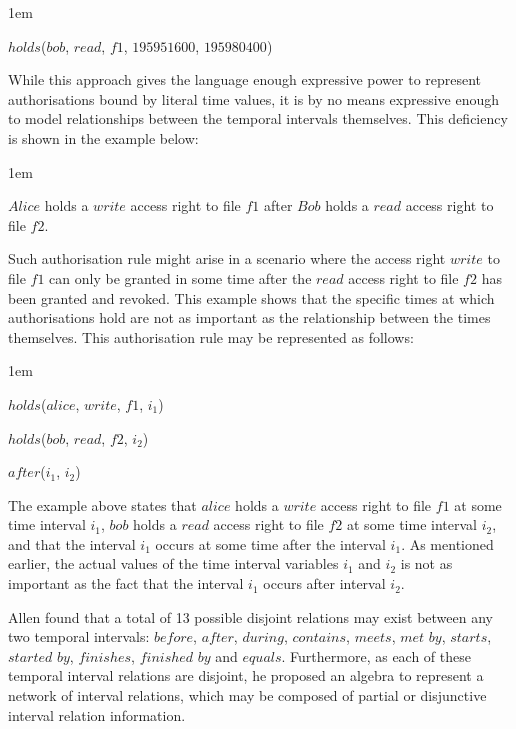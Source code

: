 \documentclass[global,twocolumn,final]{svjour}
\newenvironment{vquote}
  {\begin{list}{}{\leftmargin 1em}\item[]}
  {\end{list}}
\begin{document}
    \begin{vquote}
      $holds$($bob$, $read$, $f1$, $195951600$, $195980400$)
    \end{vquote}

    While this approach gives the language enough expressive power to represent
    authorisations bound by literal time values, it is by no means expressive
    enough to model relationships between the temporal intervals themselves.
    This deficiency is shown in the example below:

    \begin{vquote}
      $Alice$ holds a $write$ access right to file $f1$ after $Bob$ holds a
      $read$ access right to file $f2$.
    \end{vquote}

    Such authorisation rule might arise in a scenario where the access right
    $write$ to file $f1$ can only be granted in some time after the $read$
    access right to file $f2$ has been granted and revoked. This example shows
    that the specific times at which authorisations hold are not as important
    as the relationship between the times themselves. This authorisation rule
    may be represented as follows:

    \begin{vquote}
      $holds$($alice$, $write$, $f1$, $i_{1}$)

      $holds$($bob$, $read$, $f2$, $i_{2}$)

      $after$($i_{1}$, $i_{2}$)
    \end{vquote}

    The example above states that $alice$ holds a $write$ access right to file
    $f1$ at some time interval $i_{1}$, $bob$ holds a $read$ access right to
    file $f2$ at some time interval $i_{2}$, and that the interval $i_{1}$
    occurs at some time after the interval $i_{1}$. As mentioned earlier, the
    actual values of the time interval variables $i_{1}$ and $i_{2}$ is not as
    important as the fact that the interval $i_{1}$ occurs after interval
    $i_{2}$.

    Allen \cite{AL} found that a total of 13 possible disjoint relations may
    exist between any two temporal intervals: $before$, $after$, $during$,
    $contains$, $meets$, $met$ $by$, $starts$, $started$ $by$, $finishes$,
    $finished$ $by$ and $equals$. Furthermore, as each of these temporal
    interval relations are disjoint, he proposed an algebra to represent a
    network of interval relations, which may be composed of partial or
    disjunctive interval relation information.
\end{document}
